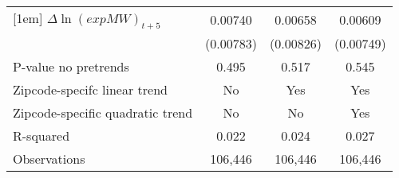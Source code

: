 {\begin{tabular}{l*{3}{c}}
[1em]
$\Delta \ln(exp MW)_{t+5}$&  0.00740         &  0.00658         &  0.00609         \\
          &(0.00783)         &(0.00826)         &(0.00749)         \\
\hline
P-value no pretrends&    0.495         &    0.517         &    0.545         \\
Zipcode-specifc linear trend&       No         &      Yes         &      Yes         \\
Zipcode-specific quadratic trend&       No         &       No         &      Yes         \\
R-squared &    0.022         &    0.024         &    0.027         \\
Observations&  106,446         &  106,446         &  106,446         \\
\hline\hline
\end{tabular}
}
